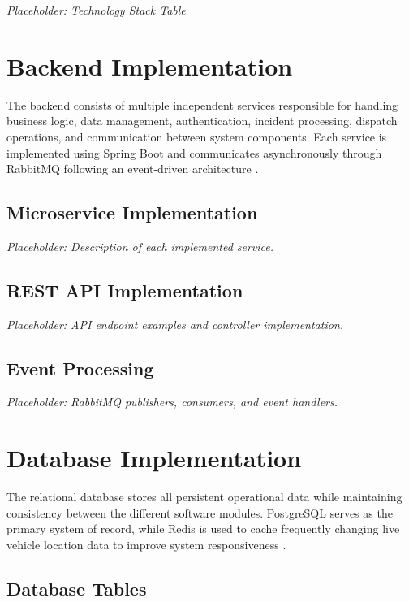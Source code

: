 \textit{Placeholder: Technology Stack Table}


\section{Backend Implementation}

The backend consists of multiple independent services responsible for handling business logic, data management, authentication, incident processing, dispatch operations, and communication between system components. Each service is implemented using Spring Boot and communicates asynchronously through RabbitMQ following an event-driven architecture \cite{springboot,rabbitmq}.

\subsection{Microservice Implementation}

\textit{Placeholder: Description of each implemented service.}

\subsection{REST API Implementation}

\textit{Placeholder: API endpoint examples and controller implementation.}

\subsection{Event Processing}

\textit{Placeholder: RabbitMQ publishers, consumers, and event handlers.}


\section{Database Implementation}

The relational database stores all persistent operational data while maintaining consistency between the different software modules. PostgreSQL serves as the primary system of record, while Redis is used to cache frequently changing live vehicle location data to improve system responsiveness \cite{postgresql,redis}.

\subsection{Database Tables}

